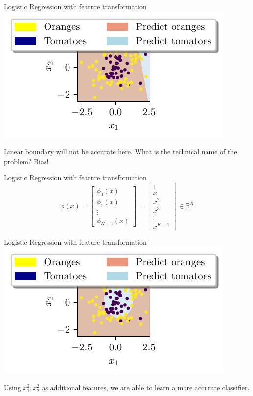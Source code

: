 \documentclass{beamer}
\begin{document}
\begin{frame}{Logistic Regression with feature transformation}
\includegraphics{../figures/logistic-regression/logisitic-linear-prediction.pdf}

Linear boundary will not be accurate here. What is the technical name of the problem?
\pause Bias! 
\end{frame}

\begin{frame}{Logistic Regression with feature transformation}
$$
\phi(x)=\left[\begin{array}{c}
{\phi_{0}(x)} \\
{\phi_{1}(x)} \\
{\vdots} \\
{\phi_{K-1}(x)}
\end{array}\right]=\left[\begin{array}{c}
{1} \\
{x} \\
{x^{2}} \\
{x^{3}} \\
{\vdots} \\
{x^{K-1}}
\end{array}\right] \in \mathbb{R}^{K}
$$
\end{frame}


\begin{frame}{Logistic Regression with feature transformation}
\includegraphics{../figures/logistic-regression/logisitic-circular-prediction.pdf}

Using $x_1^2, x_2^2$ as additional features, we are able to learn a more accurate classifier. 
\end{frame}
\end{document}
